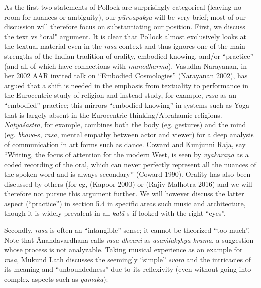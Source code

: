 As the first two statements of Pollock are surprisingly categorical (leaving no room for nuances or ambiguity), our \textsl{pūrvapakṣa} will be very brief; most of our discussion will therefore focus on substantiating our position. First, we discuss the text vs “oral" argument. It is clear that Pollock almost exclusively looks at the textual material even in the \textsl{rasa} context and thus ignores one of the main strengths of the Indian tradition of orality, embodied knowing, and/or “practice” (and all of which have connections with \textsl{manodharma}). Vasudha Narayanan, in her 2002 AAR invited talk on “Embodied Cosmologies” (Narayanan 2002), has argued that a shift is needed in the emphasis from textuality to performance in the Eurocentric study of religion and instead study, for example, \textsl{rasa} as an “embodied” practice; this mirrors “embodied knowing” in systems such as Yoga that is largely absent in the Eurocentric thinking/Abrahamic religions. \textsl{Nāṭyaśāstra}, for example, combines both the body (eg. gestures) and the mind (eg. \textsl{bhāva}-s, \textsl{rasa}, mental empathy between actor and viewer) for a deep analysis of communication in art forms such as dance. Coward and Kunjunni Raja, say “Writing, the focus of attention for the modern West, is seen by \textsl{vyākaraṇa} as a coded recording of the oral, which can never perfectly represent all the nuances of the spoken word and is always secondary” (Coward 1990). Orality has also been discussed by others (for eg, (Kapoor 2000) or (Rajiv Malhotra 2016) and we will therefore not pursue this argument further. We will however discuss the latter aspect (“practice”) in section 5.4 in specific areas such music and architecture, though it is widely prevalent in all \textsl{kalā}-s if looked with the right “eyes”.

Secondly, \textsl{rasa} is often an “intangible” sense; it cannot be theorized “too much”. Note that Ānandavardhana calls \textsl{rasa-dhvani} as \textsl{asaṁlakṣhya-krama}, a suggestion whose process is not analyzable. Taking musical experience as an example for \textsl{rasa}, Mukund Lath discusses the seemingly “simple” \textsl{svara} and the intricacies of its meaning and “unboundedness” due to its reflexivity (even without going into complex aspects such as \textsl{gamaka}):

